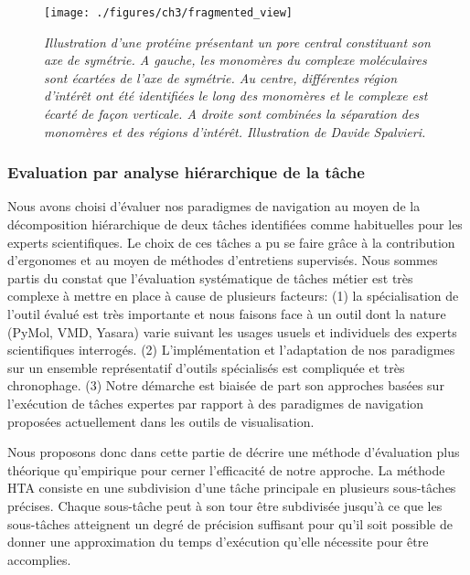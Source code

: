 \begin{figure}[h]
  \centering
  {\texttt{[image: ./figures/ch3/fragmented\_view]}}
    \caption[Illustration d'une protéine présentant un pore central constituant son axe de symétrie.]{{\it Illustration d'une protéine présentant un pore central constituant son axe de symétrie. A gauche, les monomères du complexe moléculaires sont écartées de l'axe de symétrie. Au centre, différentes région d'intérêt ont été identifiées le long des monomères et le complexe est écarté de façon verticale. A droite sont combinées la séparation des monomères et des régions d'intérêt. Illustration de Davide Spalvieri.}}
  \label{Fig:fragmented_view}
  \hspace{0.2cm}
\end{figure}


\subsubsection{Evaluation par analyse hiérarchique de la tâche} \label{hta_eval}

Nous avons choisi d'évaluer nos paradigmes de navigation au moyen de la décomposition hiérarchique de deux tâches identifiées comme habituelles pour les experts scientifiques. Le choix de ces tâches a pu se faire grâce à la contribution d'ergonomes et au moyen de méthodes d'entretiens supervisés.
Nous sommes partis du constat que l'évaluation systématique de tâches métier est très complexe à mettre en place à cause de plusieurs facteurs: (1) la spécialisation de l'outil évalué est très importante et nous faisons face à un outil dont la nature (PyMol, VMD, Yasara) varie suivant les usages usuels et individuels des experts scientifiques interrogés. (2) L'implémentation et l'adaptation de nos paradigmes sur un ensemble représentatif d'outils spécialisés est compliquée et très chronophage. (3) Notre démarche est biaisée de part son approches basées sur l'exécution de tâches expertes par rapport à des paradigmes de navigation proposées actuellement dans les outils de visualisation. %

Nous proposons donc dans cette partie de décrire une méthode d'évaluation plus théorique qu'empirique pour cerner l'efficacité de notre approche. La méthode HTA consiste en une subdivision d'une tâche principale en plusieurs sous-tâches précises. Chaque sous-tâche peut à son tour être subdivisée jusqu'à ce que les sous-tâches atteignent un degré de précision suffisant pour qu'il soit possible de donner une approximation du temps d'exécution qu'elle nécessite pour être accomplies.

